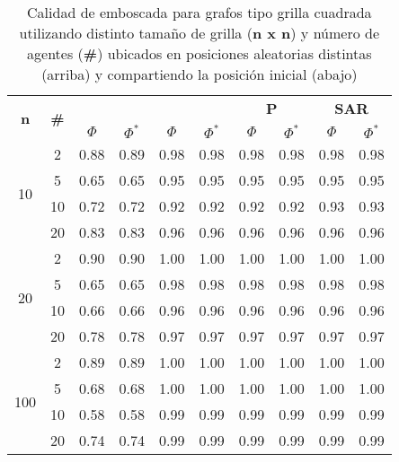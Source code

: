 \begin{table}
	\caption{Calidad de emboscada para grafos tipo grilla cuadrada
	utilizando distinto tamaño de grilla (\textbf{n x n}) y n\'umero de agentes
	(\textbf{\#}) ubicados en posiciones aleatorias distintas (arriba) y
	compartiendo la posici\'on inicial (abajo)}
	\label{tab:ambush_grid}
	\centering
	\begin{small}
		\setlength{\tabcolsep}{4pt}
		\begin{tabular}{|c|c|cc|cc|cc|cc|}
			\hline
			\multirow{2}{*}{\textbf{n}} &
			\multirow{2}{*}{\textbf{\#}} &
			\multicolumn{2}{c|}{\textbf{\astar}} &
			\multicolumn{2}{c|}{\textbf{\ambush}} &
			\multicolumn{2}{c|}{\textbf{P}} &
			\multicolumn{2}{c|}{\textbf{SAR}}\\
			& & $\Phi$ & $\Phi^*$ & $\Phi$ & $\Phi^*$&
			$\Phi$ & $\Phi^*$& $\Phi$ & $\Phi^*$\\
			\hline
			\multirow{4}{*}{10}
			 & 2 & 0.88 & 0.89 & 0.98 & 0.98 & 0.98 & 0.98 & 0.98 & 0.98\\
			 & 5 & 0.65 & 0.65 & 0.95 & 0.95 & 0.95 & 0.95 & 0.95 & 0.95\\
			 & 10 & 0.72 & 0.72 & 0.92 & 0.92 & 0.92 & 0.92 & 0.93 & 0.93\\
			 & 20 & 0.83 & 0.83 & 0.96 & 0.96 & 0.96 & 0.96 & 0.96 & 0.96\\
			\hline
			\multirow{4}{*}{20}
			 & 2 & 0.90 & 0.90 & 1.00 & 1.00 & 1.00 & 1.00 & 1.00 & 1.00\\
			 & 5 & 0.65 & 0.65 & 0.98 & 0.98 & 0.98 & 0.98 & 0.98 & 0.98\\
			 & 10 & 0.66 & 0.66 & 0.96 & 0.96 & 0.96 & 0.96 & 0.96 & 0.96\\
			 & 20 & 0.78 & 0.78 & 0.97 & 0.97 & 0.97 & 0.97 & 0.97 & 0.97\\
			 \hline
			\multirow{4}{*}{100}
			 & 2 & 0.89 & 0.89 & 1.00 & 1.00 & 1.00 & 1.00 & 1.00 & 1.00\\
			 & 5 & 0.68 & 0.68 & 1.00 & 1.00 & 1.00 & 1.00 & 1.00 & 1.00\\
			 & 10 & 0.58 & 0.58 & 0.99 & 0.99 & 0.99 & 0.99 & 0.99 & 0.99\\
			 & 20 & 0.74 & 0.74 & 0.99 & 0.99 & 0.99 & 0.99 & 0.99 & 0.99\\
			 \hline
		\end{tabular}
		

\end{small}
\end{table}
